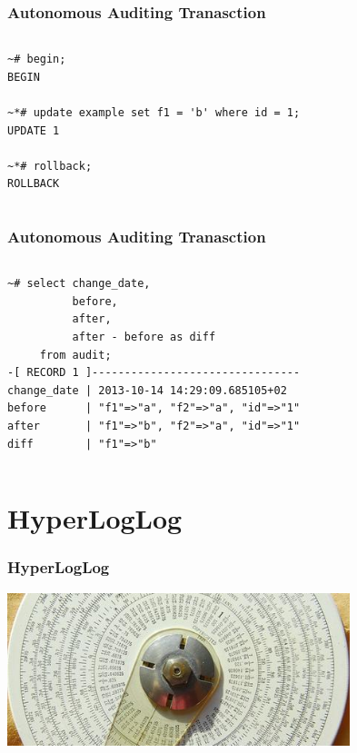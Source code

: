 \documentclass{beamer}
\begin{document}
\begin{frame}[fragile]
  \frametitle{Autonomous Auditing Tranasction}

\begin{columns}
\begin{verbatim}
~# begin;
BEGIN

~*# update example set f1 = 'b' where id = 1;
UPDATE 1

~*# rollback;
ROLLBACK
\end{verbatim}  
\end{columns}
\end{frame}

\begin{frame}[fragile]
  \frametitle{Autonomous Auditing Tranasction}

  \vfill

\begin{columns}
\begin{verbatim}
~# select change_date,
          before,
          after,
          after - before as diff
     from audit;
-[ RECORD 1 ]--------------------------------
change_date | 2013-10-14 14:29:09.685105+02
before      | "f1"=>"a", "f2"=>"a", "id"=>"1"
after       | "f1"=>"b", "f2"=>"a", "id"=>"1"
diff        | "f1"=>"b"
\end{verbatim}  
\end{columns}
\end{frame}

\section{HyperLogLog}

\begin{frame}[fragile]
  \frametitle{HyperLogLog}

  \vfill

\begin{center}
  \includegraphics[height=12em]{cardinality1.jpg}
\end{center}
\end{frame}
\end{document}
